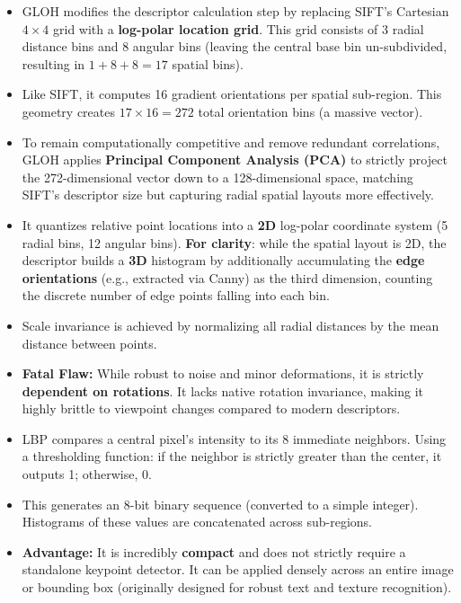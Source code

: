 {
\begin{itemize}
    \item GLOH modifies the descriptor calculation step by replacing SIFT's Cartesian $4 \times 4$ grid with a \textbf{log-polar location grid}. This grid consists of 3 radial distance bins and 8 angular bins (leaving the central base bin un-subdivided, resulting in $1 + 8 + 8 = 17$ spatial bins).
    \item Like SIFT, it computes 16 gradient orientations per spatial sub-region. This geometry creates $17 \times 16 = 272$ total orientation bins (a massive vector).
    \item To remain computationally competitive and remove redundant correlations, GLOH applies \textbf{Principal Component Analysis (PCA)} to strictly project the 272-dimensional vector down to a 128-dimensional space, matching SIFT's descriptor size but capturing radial spatial layouts more effectively.
\end{itemize}}

{
\begin{itemize}
    \item It quantizes relative point locations into a \textbf{2D} log-polar coordinate system (5 radial bins, 12 angular bins). \textbf{For clarity}: while the spatial layout is 2D, the descriptor builds a \textbf{3D} histogram by additionally accumulating the \textbf{edge orientations} (e.g., extracted via Canny) as the third dimension, counting the discrete number of edge points falling into each bin.
    \item Scale invariance is achieved by normalizing all radial distances by the mean distance between points.
    \item \textbf{Fatal Flaw:} While robust to noise and minor deformations, it is strictly \textbf{dependent on rotations}. It lacks native rotation invariance, making it highly brittle to viewpoint changes compared to modern descriptors.
\end{itemize}}

{
\begin{itemize}
    \item LBP compares a central pixel's intensity to its 8 immediate neighbors. Using a thresholding function: if the neighbor is strictly greater than the center, it outputs 1; otherwise, 0.
    \item This generates an 8-bit binary sequence (converted to a simple integer). Histograms of these values are concatenated across sub-regions.
    \item \textbf{Advantage:} It is incredibly \textbf{compact} and does not strictly require a standalone keypoint detector. It can be applied densely across an entire image or bounding box (originally designed for robust text and texture recognition).
\end{itemize}}

